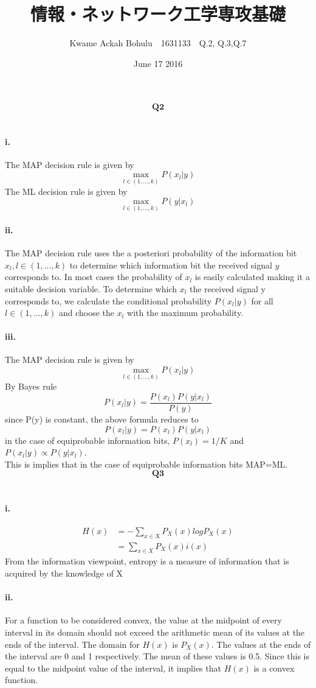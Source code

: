 \documentclass[24 pts]{article}
\title{情報・ネットワーク工学専攻基礎 }
\date{June 17 2016}
\author{Kwame Ackah Bohulu　1631133　Q.2, Q.3,Q.7}
\begin{document}
\maketitle
\[\textbf{Q2}\]\\
\paragraph{i.} The MAP decision rule is given by
$$\max_{l\in(1,...,k)} P(x_l|y)$$
The ML decision rule is given by
$$\max_{l\in(1,...,k)} P(y|x_l)$$
\paragraph{ii.} The MAP decision rule uses the a posteriori probability of the information bit $x_l,l\in(1,...,k) $ to determine which information bit the received signal $y$ corresponds to. In most cases the probability of $x_l$ is easily calculated making it a suitable decision variable. To determine which $x_l$ the received signal y corresponds to, we calculate the conditional probability $P(x_l|y)$ for all $l\in(1,...,k)$ and choose the $x_l$ with the maximum probability.
\paragraph{iii.} The MAP decision rule is given by
$$\max_{l\in(1,...,k)} P(x_l|y)$$
By Bayes rule
$$ P(x_l|y) = \frac{P(x_l)P(y|x_l)}{P(y)}$$
since P(y) is constant, the above formula reduces to
$$ P(x_l|y) = P(x_l)P(y|x_l)$$
in the case of equiprobable information bits,  $P(x_l)=1/K$ and $ P(x_l|y) \propto P(y|x_l)$.\\
This is implies that in the case of equiprobable information bits MAP=ML.
\newpage
\[\textbf{Q3}\]\\
\paragraph{i.}
\begin{equation*}
\begin{split}
H(x)&=-\sum_{x\in X} P_X(x)logP_X(x)\\
&=\sum_{x\in X} P_X(x)i(x)
\end{split}
\end{equation*}
From the information viewpoint, entropy is a measure of information that is acquired by the  knowledge of X

\paragraph{ii.}For a function to be considered convex, the value at the midpoint of every interval in its domain should not exceed the arithmetic mean of its values at the ends of the interval. The domain for $H(x)$ is $P_X(x)$. The values at the ends of the interval are 0 and 1 respectively. The mean of these values is 0.5. Since this is equal to the midpoint value of the interval, it implies that $H(x)$ is a convex function.
\end{document}
